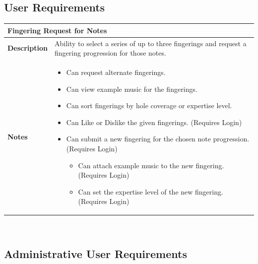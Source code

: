 \documentclass[12pt,english]{article}
\providecommand{\tabularnewline}{\\}
\providecommand{\tabularnewline}{\\}
\begin{document}
\subsection{User Requirements}

\begin{tabular}{|p{3cm}|p{13cm}|}
\hline 
\multicolumn{2}{|l|}{\textbf{Fingering Request for Notes}}\tabularnewline
\hline 
\textbf{Description}  & Ability to select a series of up to three fingerings and request a
fingering progression for those notes. \tabularnewline
\hline 
\textbf{Notes}  & \begin{itemize}
\item Can request alternate fingerings. 
\item Can view example music for the fingerings. 
\item Can sort fingerings by hole coverage or expertise level. 
\item Can \textquotedbl{}Like\textquotedbl{} or \textquotedbl{}Dislike\textquotedbl{}
the given fingerings. (Requires Login) 
\item Can submit a new fingering for the chosen note progression. (Requires
Login) 

\begin{itemize}
\item Can attach example music to the new fingering. (Requires Login) 
\item Can set the expertise level of the new fingering. (Requires Login) \end{itemize}
\end{itemize}
\tabularnewline
\hline 
\end{tabular}\\[0.5cm]


\subsection{Administrative User Requirements}
\end{document}
